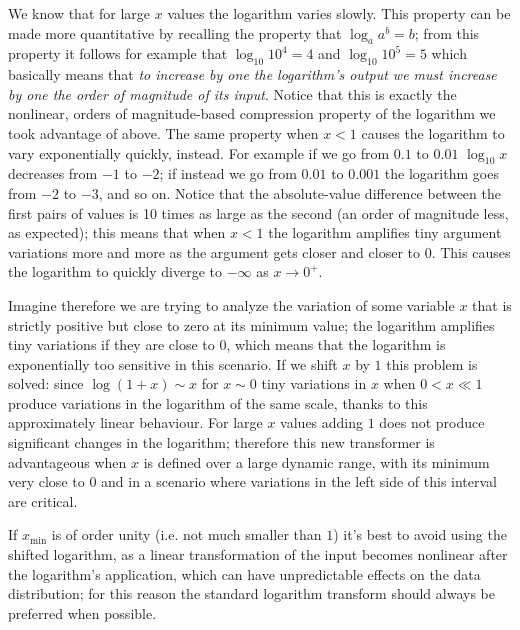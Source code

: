 We know that for large $x$ values the logarithm varies slowly. This property can be made more quantitative by recalling the property that $\log_a a^b = b$; from this property it follows for example that $\log_{10} 10^4 = 4$ and $\log_{10} 10^5 = 5$ which basically means that \emph{to increase by one the logarithm's output we must increase by one the order of magnitude of its input}. Notice that this is exactly the nonlinear, orders of magnitude-based compression property of the logarithm we took advantage of above. 
The same property when $x<1$ causes the logarithm to vary exponentially quickly, instead. For example if we go from $0.1$ to $0.01$ $\log_{10}x$ decreases from $-1$ to $-2$; if instead we go from $0.01$ to $0.001$ the logarithm goes from $-2$ to $-3$, and so on. Notice that the absolute-value difference between the first pairs of values is 10 times as large as the second (an order of magnitude less, as expected); this means that when $x<1$ the logarithm amplifies tiny argument variations more and more as the argument gets closer and closer to $0$. This causes the logarithm to quickly diverge to $-\infty$ as $x\to 0^+$.

Imagine therefore we are trying to analyze the variation of some variable $x$ that is strictly positive but close to zero at its minimum value; the logarithm amplifies tiny variations if they are close to $0$, which means that the logarithm is exponentially too sensitive in this scenario. If we shift $x$ by $1$ this problem is solved: since $\log(1+x)\sim x$ for $x\sim 0$ tiny variations in $x$ when $0<x\ll 1$ produce variations in the logarithm of the same scale, thanks to this approximately linear behaviour.
For large $x$ values adding $1$ does not produce significant changes in the logarithm; therefore this new transformer is advantageous when $x$ is defined over a large dynamic range, with its minimum very close to $0$ and in a scenario where variations in the left side of this interval are critical.

If $x_{\text{min}}$ is of order unity (i.e. not much smaller than $1$) it's best to avoid using the shifted logarithm, as a linear transformation of the input becomes nonlinear after the logarithm's application, which can have unpredictable effects on the data distribution; for this reason the standard logarithm transform should always be preferred when possible.

